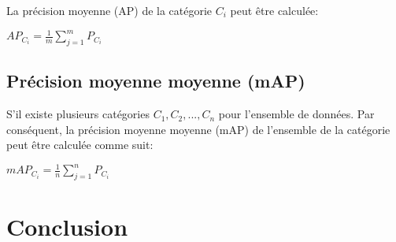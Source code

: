           La précision moyenne (AP) de la catégorie $C_i$ peut être calculée:
          \begin{center} $AP_{C_i} = \frac{1}{m} \sum^{m}_{j=1} P_{C_i}$ \end{center}

          \subsection{Précision moyenne moyenne  (mAP)}
          S'il existe plusieurs catégories ${C_1, C_2, ... , C_n}$ pour l'ensemble de données. Par conséquent, la précision moyenne moyenne (mAP) de l'ensemble de la catégorie peut être calculée comme suit:
          \begin{center} $mAP_{C_i} = \frac{1}{n} \sum^{n}_{j=1} P_{C_i}$ \end{center}





\section{Conclusion} 
